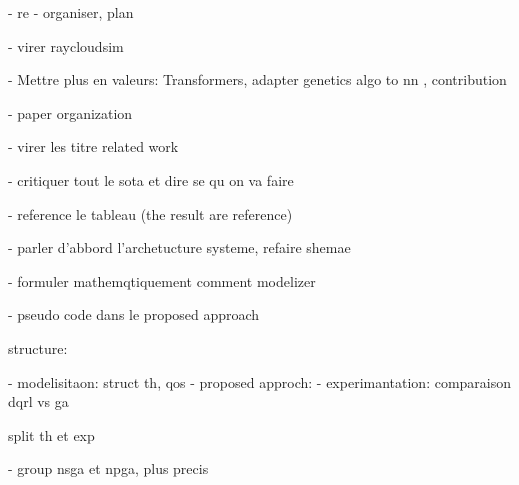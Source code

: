 

- re - organiser, plan 

- virer raycloudsim

- Mettre plus en valeurs: Transformers, adapter genetics algo to nn , contribution

- paper organization

- virer les titre related work

- critiquer tout le sota et dire se qu on va faire 

- reference le tableau (the result are reference)

- parler d'abbord l'archetucture systeme, refaire shemae

- formuler mathemqtiquement comment modelizer

- pseudo code dans le proposed approach

structure:

- modelisitaon: struct th, qos
- proposed approch: 
- experimantation: comparaison dqrl vs ga

split th et exp


- group nsga et npga, plus precis




